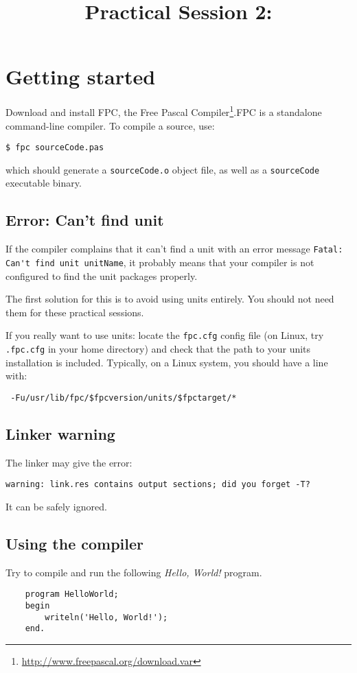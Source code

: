 \documentclass{../../tp}
\title{Practical Session 2: \pascal}
\author{}
\begin{document}
\maketitle


\section{Getting started}

Download and install \textsf{FPC}, the \textsf{Free Pascal Compiler}\footnote{ \url{http://www.freepascal.org/download.var}}.\textsf{FPC} is a \pascal standalone command-line compiler. To compile a \pascal source, use: 

\verb|$ fpc sourceCode.pas|

which should generate a \verb|sourceCode.o| object file, as well as a \verb|sourceCode| executable binary.

\subsection{Error: Can't find unit}

If the compiler complains that it can't find a unit with an error message \verb|Fatal: Can't find unit unitName|, it probably means that your compiler is not configured to find the unit packages properly.

The first solution for this is to avoid using units entirely. You should not need them for these practical sessions.

If you really want to use units: locate the \verb|fpc.cfg| config file (on Linux, try \verb|.fpc.cfg| in your home directory) and check that the path to your units installation is included. Typically, on a Linux system, you should have a line with:

\verb| -Fu/usr/lib/fpc/$fpcversion/units/$fpctarget/*|

\subsection{Linker warning}

The linker may give the error:

\verb|warning: link.res contains output sections; did you forget -T?|

It can be safely ignored. 

\subsection{Using the compiler}
\begin{instruction}
	Try to compile and run the following \emph{Hello, World!} program.
	
	\begin{verbatim}
	program HelloWorld;
	begin 
		writeln('Hello, World!');
	end.
	\end{verbatim}
\end{instruction}
\end{document}
